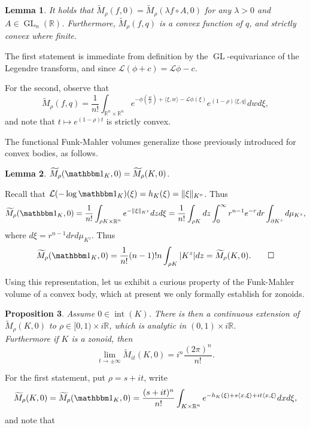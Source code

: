 \documentclass[reqno,10pt]{amsart}
\newtheorem{Proposition}{Proposition}[section]
\newtheorem{Lemma}[Proposition]{Lemma}
\DeclareMathOperator{\inter}{int}
\DeclareMathOperator{\GL}{GL}
\newcommand{\R}{\mathbb{R}}
\begin{document}
 \begin{Lemma}\label{lem:functional_invariance}
 It holds that $\widetilde M_\rho(f,0)=\widetilde M_\rho(\lambda f\circ A,0)$ for any $\lambda> 0$ and $A\in\GL_n(\R)$. Furthermore, $\widetilde M_\rho(f,q)$ is a convex function of $q$, and strictly convex where finite.
 \end{Lemma}
 \proof
 The first statement is immediate from definition by the $\GL$-equivariance of the Legendre transform, and since $\mathcal L(\phi+c)=\mathcal L\phi -c$.

 For the second, observe that
 $$ \widetilde M_\rho(f,q)=\frac{1}{n!}\int_{\R^n\times\R^n} e^{-\phi(\frac{w}{\rho})+\langle \xi,w\rangle-\mathcal L\phi(\xi)}e^{(1-\rho)\langle \xi,q\rangle}dwd\xi,$$
and note that $t\mapsto e^{(1-\rho)t}$ is strictly convex.
 \endproof 
 
 
 
	The functional Funk-Mahler volumes generalize those previously introduced for convex bodies, as follows.
	
	\begin{Lemma}\label{lem:body_vs_function}
		$\widetilde M_\rho(\mathbbm 1_K, 0)=\widetilde M_\rho(K ,0)$.
	\end{Lemma} 
	\proof
	Recall that $\mathcal L(-\log \mathbbm 1_K)(\xi)=h_K(\xi)=\|\xi\|_{K^o}$. Thus 
	$$\widetilde M_\rho(\mathbbm 1_K, 0)=\frac{1}{n!}\int_{\rho K\times\R^n}e^{-\|\xi\|_{K^z}}dzd\xi=\frac{1}{n!}\int_{\rho K}dz \int_0^\infty r^{n-1}e^{-r}dr\int_{\partial K^z}d\mu_{K^z}, $$
	where $d\xi=r^{n-1}drd\mu_{K^z}$. Thus 
	$$\widetilde M_\rho(\mathbbm 1_K, 0)= \frac{1}{n!}(n-1)!n\int_{\rho K} |K^z|dz=\widetilde M_\rho(K, 0). \qedhere$$
	
	
   Using this representation, let us exhibit a curious property of the Funk-Mahler volume of a convex body, which at present we only formally establish for zonoids. 
 
 \begin{Proposition}\label{prop:to_the_infinity_and_beyond} Assume $0\in \inter(K)$. There is then a continuous extension of $\widetilde M_\rho(K, 0)$ to $\rho\in[0,1)\times i\R$, which is analytic in $(0,1)\times i\R$. 
  \\Furthermore if $K$ is a zonoid, then
 	$$\lim_{t\to \pm\infty} \widetilde M_{it}(K,0)=i^n\frac{(2\pi)^n}{n!}.$$
 \end{Proposition}
 \proof
 
 For the first statement, put $\rho=s+it$, write 
  $$\widetilde M_{\rho}(K,0)= \widetilde M_{\rho}(\mathbbm 1_K,0)=\frac{(s+it)^n}{n!}\int_{K\times\R^n} e^{-h_K(\xi)+s\langle x,\xi\rangle +it \langle x,\xi\rangle}dxd\xi, $$
   and note that 
  
\end{document}
